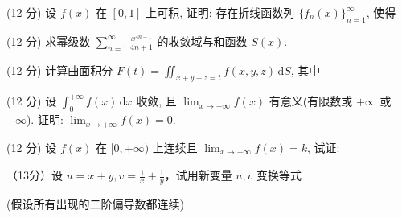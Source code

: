 (12 分) 设 $f(x)$ 在 $[0,1]$ 上可积, 证明: 存在折线函数列 $\{f_n(x)\}_{n=1}^{\infty}$, 使得\par
\nopagebreak[4]
(12 分) 求幂级数 $\sum_{n=1}^{\infty} \frac{x^{4n-1}}{4n+1}$ 的收敛域与和函数 $S(x)$.\par
\par{}
(12 分) 计算曲面积分 $F(t) = \iint_{x + y + z = t} f(x, y, z) \, \mathrm{d}S$, 其中\par
\nopagebreak[4]
(12 分) 设 $\int_{0}^{+\infty} f(x) \, \mathrm{d}x$ 收敛, 且 $\lim_{x \to +\infty} f(x)$ 有意义(有限数或 $+\infty$ 或 $-\infty$). 证明: $\lim_{x \to +\infty} f(x) = 0$.\par
\par{}
(12 分) 设 $f(x)$ 在 $[0, +\infty)$ 上连续且 $\lim_{x \to +\infty} f(x) = k$, 试证:\par
\nopagebreak[4]
\par{}
（13分）设 $u = x + y, v = \frac{1}{x} + \frac{1}{y}$，试用新变量 $u, v$ 变换等式\par
\nopagebreak[4]
(假设所有出现的二阶偏导数都连续)\par
